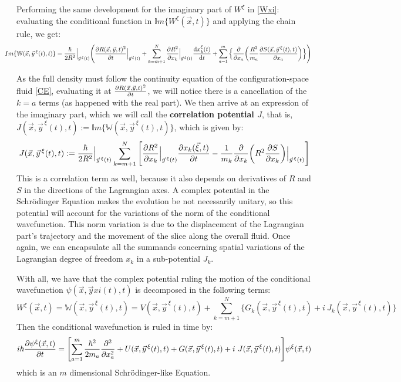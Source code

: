 \documentclass[11pt, a4paper]{article} %
\newcommand{\W}{\mathbb{W}}
\begin{document}
Performing the same development for the imaginary part of $W^\xi$ in \eqref{Wxi}: evaluating the conditional function in $\mathbb{I}m\{W^\xi(\vec{x},t)\}$ and applying the chain rule, we get:
\begin{equation}
\hspace{-0.7cm}Im\{\W(\vec{x}, \vec{y}^{\, \xi}(t),t)\}=\frac{\hbar}{2R^2}\Big\rvert_{\vec{y}^{\, \xi}(t)} \qty( \pdv{R(\vec{x},\vec{y},t)^2}{t}\Big\rvert_{\vec{y}^{\, \xi}(t)} + \sum_{k=m+1}^N \pdv{R^2}{x_k}\Big\rvert_{\vec{y}^{\, \xi}(t)} \dv{x_k^\xi(t)}{t} + \sum_{a=1}^m\Big\{\pdv{}{x_a} \qty(\frac{R^2}{m_a} \pdv{S(\vec{x}, \vec{y}^{\, \xi}(t),t)}{x_a} ) \Big\})
\end{equation}

As the full density must follow the continuity equation of the configuration-space fluid \eqref{CE}, evaluating it at $\pdv{R(\vec{x},\vec{y},t)^2}{t}$, we will notice there is a cancellation of the $k=a$ terms (as happened with the real part). We then arrive at an expression of the imaginary part, which we will call the {\bf correlation potential $J$}, that is, $J(\vec{x}, \vec{y}^{\, \xi}(t),t):=\mathbb{I}m\{\W(\vec{x}, \vec{y}^{\, \xi}(t),t)\}$, which is given by:
\begin{equation}\label{J}
J(\vec{x}, \vec{y}^{\, \xi}(t),t):= \frac{\hbar}{2R^2}\Big\rvert_{\vec{y}^{\, \xi}(t)} \sum_{k=m+1}^N \qty[ \pdv{R^2}{x_k}\Big\rvert_{\vec{y}^{\, \xi}(t)} \pdv{x_k(\vec{\xi},t)}{t} - \frac{1}{m_k} \pdv{}{x_k} \qty(R^2 \pdv{S}{x_k} )\Big\rvert_{\vec{y}^{\, \xi}(t)} ]
\end{equation}
This is a correlation term as well, because it also depends on derivatives of $R$ and $S$ in the directions of the Lagrangian axes. A complex potential in the Schrödinger Equation makes the evolution be not necessarily unitary, so this potential will account for the variations of the norm of the conditional wavefunction. This norm variation is due to the displacement of the Lagrangian part's trajectory and the movement of the slice along the overall fluid. Once again, we can encapsulate all the summands concerning spatial variations of the Lagrangian degree of freedom $x_k$ in a sub-potential $J_k$. 

With all, we have that the complex potential ruling the motion of the conditional wavefunction $\psi(\vec{x},\vec{y} xi(t),t)$ is decomposed in the following terms:
\begin{equation}
W^\xi(\vec{x},t)=\W(\vec{x}, \vec{y}^{\, \xi}(t),t)= V(\vec{x}, \vec{y}^{\, \xi}(t),t) + \sum_{k=m+1}^N\Big\{ G_k(\vec{x}, \vec{y}^{\, \xi}(t),t)+i\ J_k(\vec{x}, \vec{y}^{\, \xi}(t),t)\Big\}
\end{equation}
Then the conditional wavefunction is ruled in time by:
\begin{equation}\label{SE.GJ}
i \hbar \pdv{\psi^\xi (\vec{x},t)}{t} = \qty[\sum_{a=1}^m\frac{\hbar^2}{2m_a} \pdv[2]{}{x_a} +  U(\vec{x}, \vec{y}^{\, \xi}(t),t) + G(\vec{x}, \vec{y}^{\, \xi}(t),t)+i\ J(\vec{x}, \vec{y}^{\, \xi}(t),t)] \psi^\xi (\vec{x},t)
\end{equation}
which is an $m$ dimensional Schrödinger-like Equation.
\end{document}

